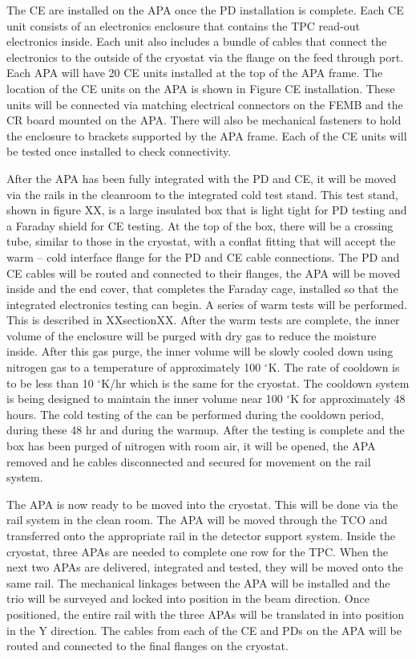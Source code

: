The CE are installed on the APA once the PD installation is complete.  Each CE unit consists of an electronics enclosure that contains the TPC read-out electronics inside.  Each unit also includes a bundle of cables that connect the electronics to the outside of the cryostat via the flange on the feed through port.  Each APA will have 20 CE units installed at the top of the APA frame.  The location of the CE units on the APA is shown in Figure CE installation.  These units will be connected via matching electrical connectors on the FEMB and the CR board mounted on the APA.  There will also be mechanical fasteners to hold the enclosure to brackets supported by the APA frame.  Each of the CE units will be tested once installed to check connectivity.  

After the APA has been fully integrated with the PD and CE, it will be moved via the rails in the cleanroom to the integrated cold test stand.  This test stand, shown in figure XX, \fixme{}is a large insulated box that is light tight for PD testing and a Faraday shield for CE testing.  At the top of the box, there will be a crossing tube, similar to those in the cryostat, with a conflat fitting that will accept the warm – cold interface flange for the PD and CE cable connections.  The PD and CE cables will be routed and connected to their flanges, the APA will be moved inside and the end cover, that completes the Faraday cage, installed so that the integrated electronics testing can begin.  A series of warm tests will be performed.  This is described in XXsectionXX.  \fixme{}
After the warm tests are complete, the inner volume of the enclosure will be purged with dry gas to reduce the moisture inside.  After this gas purge, the inner volume will be slowly cooled down using nitrogen gas to a temperature of approximately 100 $^\circ$K.  The rate of cooldown is to be less than 10 $^\circ$K/hr which is the same for the cryostat.  The cooldown system is being designed to maintain the inner volume near 100 $^\circ$K for approximately 48 hours.  The cold testing of the can be performed during the cooldown period, during these 48 hr and during the warmup.  After the testing is complete and the box has been purged of nitrogen with room air, it will be opened, the APA removed and he cables disconnected and secured for movement on the rail system.   

The APA is now ready to be moved into the cryostat.  This will be done via the rail system in the clean room.  The APA will be moved through the TCO and transferred onto the appropriate rail in the detector support system.  Inside the cryostat, three APAs are needed to complete one row for the TPC.  When the next two APAs are delivered, integrated and tested, they will be moved onto the same rail.  The mechanical linkages between the APA will be installed and the trio will be surveyed and locked into position in the beam direction.  Once positioned, the entire rail with the three APAs will be translated in into position in the Y direction.  The cables from each of the CE and PDs on the APA will be routed and connected to the final flanges on the cryostat.  

